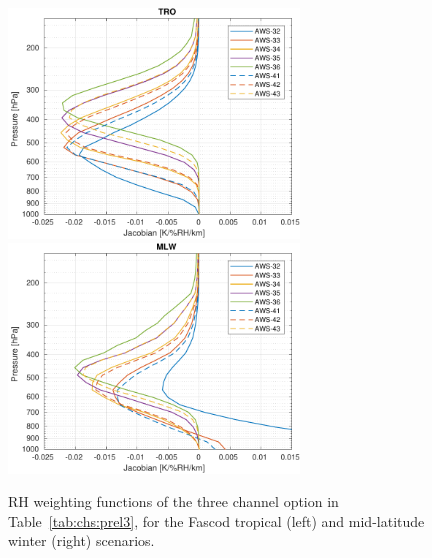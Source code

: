 \documentclass[12pt]{article}
\begin{document}
\begin{figure}[!p]
  \centering
  \includegraphics[height=61mm]{fascod_3chopt_tro}\hspace{5mm}%
  \includegraphics[clip,trim=43 0 0 0,height=61mm]{fascod_3chopt_mlw}
  \caption{RH weighting functions of the three channel option in
    Table~\ref{tab:chs:prel3}, for the Fascod tropical (left) and mid-latitude
    winter (right) scenarios.}
  \label{fig:3ch:prel}
\end{figure}
\end{document}
